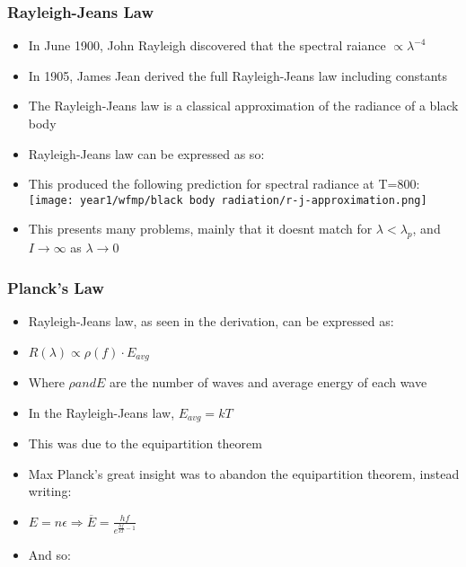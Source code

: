 \documentclass{article}
\begin{document}
\subsubsection*{Rayleigh-Jeans Law}

\begin{itemize}
    \item In June 1900, John Rayleigh discovered that the spectral raiance \(\propto \lambda^{-4}\)
    \item In 1905, James Jean derived the full Rayleigh-Jeans law including constants
    \item The Rayleigh-Jeans law is a classical approximation of the radiance of a black body
    \item Rayleigh-Jeans law can be expressed as so:
    \item This produced the following prediction for spectral radiance at T=800:
    \texttt{[image: year1/wfmp/black body radiation/r-j-approximation.png]}
    \item This presents many problems, mainly that it doesnt match for \(\lambda < \lambda_p\), and \(I\rightarrow\infty\) as \(\lambda\rightarrow 0\)
\end{itemize}

\subsubsection*{Planck's Law}

\begin{itemize}
    \item Rayleigh-Jeans law, as seen in the derivation, can be expressed as:
    \item \(R(\lambda)\propto\rho(f)\cdot E_{avg}\)
    \item Where \(\rho and E\) are the number of waves and average energy of each wave
    \item In the Rayleigh-Jeans law, \(E_{avg} = kT\)
    \item This was due to the equipartition theorem
    \item Max Planck's great insight was to abandon the equipartition theorem, instead writing:
    \item \(E=n\epsilon \Rightarrow \overline E = \frac{hf}{e^{\frac{hf}{kT}-1}}\) 
    \item And so:
\end{itemize}
\end{document}
